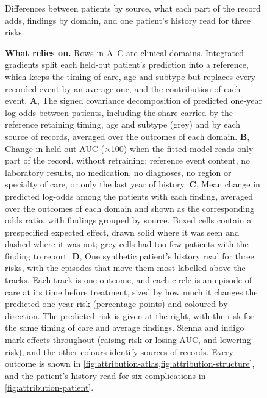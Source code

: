 \begin{figure}[p]
    {Differences between patients by source, what each part of the record adds,
    findings by domain, and one patient's history read for three risks.}
  \caption{\textbf{What \opera{} relies on.} Rows in A--C are clinical
  domains. Integrated gradients split each held-out patient's prediction into a
  reference, which keeps the timing of care, age and subtype but replaces every
  recorded event by an average one, and the contribution of each event.
  \textbf{A}, The signed covariance decomposition of predicted one-year log-odds
  between patients, including the share carried by the reference retaining timing, age and subtype (grey) and by each source of records,
  averaged over the outcomes of each domain. \textbf{B}, Change in held-out AUC
  ($\times$100) when the fitted model reads only part of the record, without
  retraining: reference event content, no laboratory results, no medication, no
  diagnoses, no region or specialty of care, or only the last year of history. \textbf{C}, Mean change in
  predicted log-odds among the patients with each finding, averaged over the
  outcomes of each domain and shown as the corresponding odds ratio, with findings grouped by source. Boxed cells contain
  a prespecified expected effect, drawn solid where it was seen and dashed where
  it was not; grey cells had too few patients with the finding to report.
  \textbf{D}, One synthetic patient's history read for three risks, with the
  episodes that move them most labelled above the tracks. Each track is one
  outcome, and each circle is an episode of care at its time before treatment,
  sized by how much it changes the predicted one-year risk (percentage points)
  and coloured by direction. The predicted risk is given at the right, with the
  risk for the same timing of care and average findings. Sienna and indigo mark
  effects throughout (raising risk or losing AUC, and lowering risk), and the
  other colours identify sources of records. Every outcome is shown in
  \cref{fig:attribution-atlas,fig:attribution-structure}, and the patient's
  history read for six complications in \cref{fig:attribution-patient}.}
  \label{fig:attribution-main}
\end{figure}

